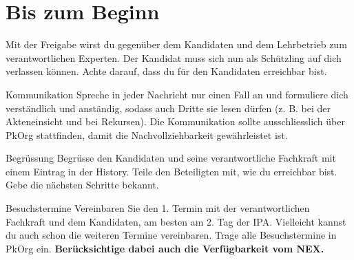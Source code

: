 \section{Bis zum Beginn}
Mit der Freigabe wirst du gegenüber dem Kandidaten und dem Lehrbetrieb zum verantwortlichen Experten. Der Kandidat muss sich nun als Schützling auf dich verlassen können. Achte darauf, dass du für den Kandidaten erreichbar bist.

\begin{taskitemwithoutcomment}{Kommunikation}
  Spreche in jeder Nachricht nur einen Fall an und formuliere dich verständlich und anständig, sodass auch Dritte sie lesen dürfen (z. B. bei der Akteneinsicht und bei Rekursen).
  Die Kommunikation sollte ausschliesslich über PkOrg stattfinden, damit die Nachvollziehbarkeit gewährleistet ist.
\end{taskitemwithoutcomment}
\begin{taskitemwithoutcomment}{Begrüssung}
  Begrüsse den Kandidaten und seine verantwortliche Fachkraft mit einem Eintrag in der History. Teile den Beteiligten mit, wie du erreichbar bist. Gebe die nächsten Schritte bekannt.
\end{taskitemwithoutcomment}
\begin{taskitem}{Besuchstermine}
  Vereinbaren Sie den 1. Termin mit der verantwortlichen Fachkraft und dem Kandidaten, am besten am 2. Tag der IPA. Vielleicht kannst du auch schon die weiteren Termine vereinbaren. Trage alle Besuchstermine in PkOrg ein. \textbf{Berücksichtige dabei auch die Verfügbarkeit vom NEX.}
\end{taskitem}
